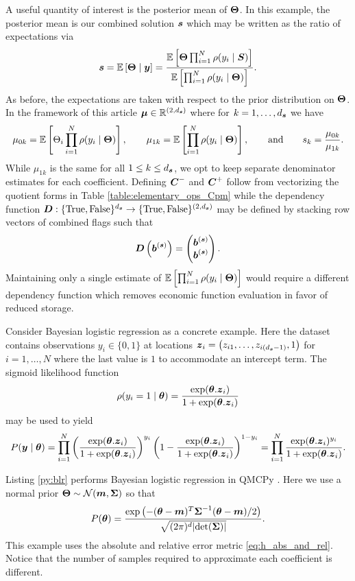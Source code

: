 \documentclass{article}[12pt]
\begin{document}
A useful quantity of interest is the posterior mean of $\boldsymbol{\Theta}$. In this example, the posterior mean is our combined solution $\boldsymbol{s}$ which may be written as the ratio of expectations via
$$\boldsymbol{s} = \mathbb{E}\left[\boldsymbol{\Theta} \mid \boldsymbol{y}\right] = \frac{\mathbb{E}\left[\boldsymbol{\Theta} \prod_{i=1}^{N} \rho(y_i \mid \boldsymbol{S})\right]}{\mathbb{E}\left[\prod_{i=1}^{N} \rho(y_i \mid \boldsymbol{\Theta})\right]}.$$
As before, the expectations are taken with respect to the prior distribution on $\boldsymbol{\Theta}$. In the framework of this article $\boldsymbol{\mu} \in \mathbb{R}^{(2, d_{\boldsymbol{s}})}$ where for $k=1,\dots,d_{\boldsymbol{s}}$ we have 
$$\mu_{0k} = \mathbb{E}\left[\Theta_i \prod_{i=1}^{N} \rho(y_i \mid \boldsymbol{\Theta})\right], \qquad \mu_{1k} = \mathbb{E}\left[\prod_{i=1}^{N} \rho(y_i \mid \boldsymbol{\Theta})\right], \qquad \text{and} \qquad s_k = \frac{\mu_{0k}}{\mu_{1k}}.$$
While $\mu_{1k}$ is the same for all $1 \leq k \leq d_{\boldsymbol{s}}$, we opt to keep separate denominator estimates for each coefficient. Defining $\boldsymbol{C}^-$ and $\boldsymbol{C}^+$ follow from vectorizing the quotient forms in Table \ref{table:elementary_ops_Cpm} while the dependency function $\boldsymbol{D}: \{\text{True},\text{False}\}^{d_{\boldsymbol{s}}} \to \{\text{True},\text{False}\}^{(2, d_{\boldsymbol{s}})}$ may be defined by stacking row vectors of combined flags such that
$$\boldsymbol{D}\left(\boldsymbol{b}^{(\boldsymbol{s})}\right) = \begin{pmatrix} \boldsymbol{b}^{(\boldsymbol{s})} \\ \boldsymbol{b}^{(\boldsymbol{s})} \end{pmatrix}.$$
Maintaining only a single estimate of $\mathbb{E}\left[\prod_{i=1}^{N} \rho(y_i \mid \boldsymbol{\Theta})\right]$ would require a different dependency function which removes economic function evaluation in favor of reduced storage. 

Consider Bayesian logistic regression as a concrete example. Here the dataset contains observations $y_i \in \{0,1\}$ at locations $\boldsymbol{z}_i = \left(z_{i1},\dots,z_{i(d_{\boldsymbol{s}}-1)},1\right)$ for $i=1,\dots,N$ where the last value is $1$ to accommodate an intercept term. The sigmoid likelihood function
$$\rho(y_i = 1 \mid \boldsymbol{\theta}) = \frac{\exp(\boldsymbol{\theta}.\boldsymbol{z}_i)}{1+\exp(\boldsymbol{\theta}.\boldsymbol{z}_i)}$$
may be used to yield
$$P(\boldsymbol{y} \mid \boldsymbol{\theta}) = \prod_{i=1}^N \left(\frac{\exp(\boldsymbol{\theta}.\boldsymbol{z}_i)}{1+\exp(\boldsymbol{\theta}.\boldsymbol{z}_i)}\right)^{y_i} \left(1-\frac{\exp(\boldsymbol{\theta}.\boldsymbol{z}_i)}{1+\exp(\boldsymbol{\theta}.\boldsymbol{z}_i)}\right)^{1-y_i} = \prod_{i=1}^N \frac{\exp(\boldsymbol{\theta}.\boldsymbol{z}_i)^{y_i}}{1+\exp(\boldsymbol{\theta}.\boldsymbol{z}_i)}.$$

Listing \ref{py:blr} performs Bayesian logistic regression in QMCPy
. Here we use a normal prior $\boldsymbol{\Theta} \sim \mathcal{N}(\boldsymbol{m},\boldsymbol{\Sigma})$ so that
$$P(\boldsymbol{\theta}) = \frac{\exp\left(-(\boldsymbol{\theta}-\boldsymbol{m})^T\boldsymbol{\Sigma}^{-1}(\boldsymbol{\theta}-\boldsymbol{m})/2\right)}{\sqrt{(2\pi)^d\lvert \det(\boldsymbol{\Sigma})\rvert }}.$$
This example uses the absolute and relative error metric \eqref{eq:h_abs_and_rel}. Notice that the number of samples required to approximate each coefficient is different. 
\end{document}

